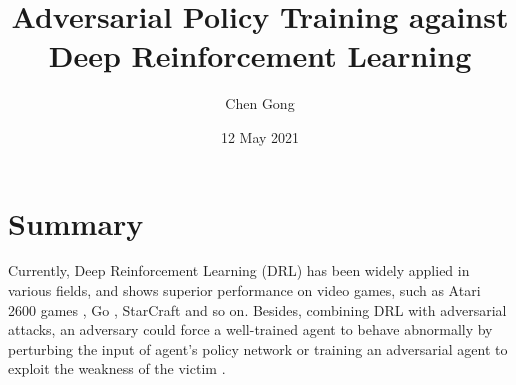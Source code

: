 \documentclass[a4paper]{article}
\title{Adversarial Policy Training against Deep Reinforcement Learning}
\author{Chen Gong}
\date{12 May 2021}
\newcommand{\RNum}[1]{\uppercase\expandafter{\romannumeral #1\relax}}
\begin{document}
\maketitle

\section{Summary}
Currently, Deep Reinforcement Learning (DRL) has been widely applied in various fields, 
and shows superior performance on video games, such as Atari 2600 games \cite{silver_mastering_2016}, Go \cite{mnih_human-level_2015}, StarCraft \RNum{2} \cite{vinyals2019grandmaster} and so on.
Besides, combining DRL with adversarial attacks, 
an adversary could force a well-trained agent to behave abnormally by perturbing the input of agent’s
policy network or training an adversarial agent to exploit the weakness of the victim \cite{adt}.
\end{document}
